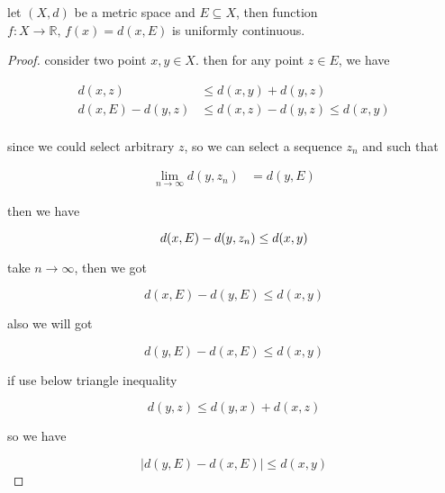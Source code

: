 \documentclass[11pt,a4paper]{article}
\begin{document}
\begin{lem}
    let $(X,d)$ be a metric space and $E \subseteq X$, then function $f: X \to \mathbb{R},\, f(x) = d(x, E)$
    is uniformly continuous.
\end{lem}

\begin{proof}
    consider two point $x,y \in X$.  then for any point $z \in E$, we have 

    \begin{align*}
        d(x,z) &\le d(x,y) + d(y,z) \\
        d(x, E) - d(y,z) &\le d(x,z) -d(y,z) \le d(x,y) \\
    \end{align*}

    since we could select arbitrary $z$, so we can select a sequence $z_n$ and such that

    \begin{align*}
        \lim_{n \to \infty}d(y,z_n) &= d(y,E) 
    \end{align*}

    then we have

    \[
        d(x, E) - d(y,z_n)  \le d(x,y) \\
    \]

    take $n \to \infty$, then we got

    \[
        d(x,E) - d(y,E) \le d(x,y)
    \]

    also we will got

    \[
        d(y,E) - d(x,E) \le d(x,y)
    \]

    if use below triangle inequality

    \[
        d(y,z) \le d(y,x) + d(x,z)
    \]

    so we have

    \[
        \lvert d(y,E) - d(x,E) \rvert \le d(x,y)
    \]

\end{proof}
\end{document}
